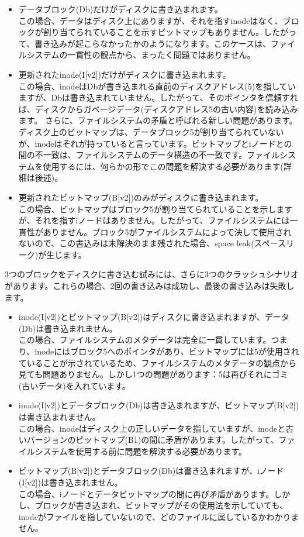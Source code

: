 \begin{itemize}
\item
  データブロック(Db)だけがディスクに書き込まれます。\\
  この場合、データはディスク上にありますが、それを指すinodeはなく、ブロックが割り当てられていることを示すビットマップもありません。したがって、書き込みが起こらなかったかのようになります。このケースは、ファイルシステムの一貫性の観点から、まったく問題ではありません。
\item
  更新されたinode(I{[}v2{]})だけがディスクに書き込まれます。\\
  この場合、inodeはDbが書き込まれる直前のディスクアドレス(5)を指していますが、Dbは書き込まれていません。したがって、そのポインタを信頼すれば、ディスクからガベージデータ(ディスクアドレス5の古い内容)を読み込みます。
  さらに、ファイルシステムの矛盾と呼ばれる新しい問題があります。ディスク上のビットマップは、データブロック5が割り当てられていないが、inodeはそれが持っていると言っています。ビットマップとiノードとの間の不一致は、ファイルシステムのデータ構造の不一致です。ファイルシステムを使用するには、何らかの形でこの問題を解決する必要があります(詳細は後述)。
\item
  更新されたビットマップ(B{[}v2{]})のみがディスクに書き込まれます。\\
  この場合、ビットマップはブロック5が割り当てられていることを示しますが、それを指すiノードはありません。したがって、ファイルシステムには一貫性がありません。ブロック5がファイルシステムによって決して使用されないので、この書込みは未解決のまま残された場合、space
  leak(スペースリーク)が生じます。
\end{itemize}

3つのブロックをディスクに書き込む試みには、さらに3つのクラッシュシナリオがあります。これらの場合、2回の書き込みは成功し、最後の書き込みは失敗します。

\begin{itemize}
\item
  inode(I{[}v2{]})とビットマップ(B{[}v2{]})はディスクに書き込まれますが、データ(Db)は書き込まれません。\\
  この場合、ファイルシステムのメタデータは完全に一貫しています。つまり、inodeにはブロック5へのポインタがあり、ビットマップには5が使用されていることが示されているため、ファイルシステムのメタデータの観点から見ても問題ありません。しかし1つの問題があります：5は再びそれにゴミ(古いデータ)を入れています。
\item
  inode(I{[}v2{]})とデータブロック(Db)は書き込まれますが、ビットマップ(B{[}v2{]})は書き込まれません。\\
  この場合、inodeはディスク上の正しいデータを指していますが、inodeと古いバージョンのビットマップ(B1)の間に矛盾があります。したがって、ファイルシステムを使用する前に問題を解決する必要があります。
\item
  ビットマップ(B{[}v2{]})とデータブロック(Db)は書き込まれますが、iノード(I{[}v2{]})は書き込まれません。\\
  この場合、iノードとデータビットマップの間に再び矛盾があります。しかし、ブロックが書き込まれ、ビットマップがその使用法を示していても、inodeがファイルを指していないので、どのファイルに属しているかわかりません。
\end{itemize}

